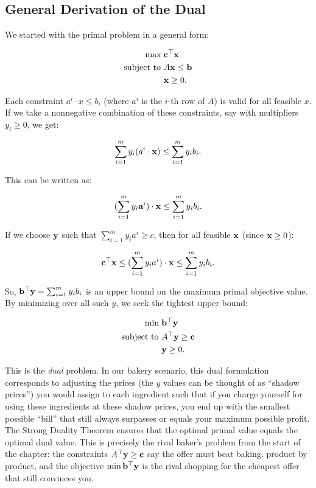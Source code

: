 \subsection*{General Derivation of the Dual}

We started with the primal problem in a general form:

\[
\begin{aligned}
\max \; & \mathbf{c}^\top \mathbf{x} \\
\mbox{subject to } & A\mathbf{x} \leq \mathbf{b} \\
& \mathbf{x} \geq 0.
\end{aligned}
\]

Each constraint $a^i \cdot x \leq b_i$ (where $a^i$ is the $i$-th row of $A$) is valid for all feasible $x$. If we take a nonnegative combination of these constraints, say with multipliers $y_i \geq 0$, we get:

\[
\sum_{i=1}^m y_i (a^i \cdot \mathbf{x}) \leq \sum_{i=1}^m y_i b_i.
\]

This can be written as:

\[
(\sum_{i=1}^m y_i \mathbf{a}^i) \cdot \mathbf{x} \leq \sum_{i=1}^m y_i b_i.
\]

If we choose $\mathbf{y}$ such that $\sum_{i=1}^m y_i a^i \geq c$, then for all feasible $\mathbf{x}$ (since $\mathbf{x} \geq 0$):

\[
\mathbf{c}^\top \mathbf{x} \leq (\sum_{i=1}^m y_i a^i)\cdot \mathbf{x} \leq \sum_{i=1}^m y_i b_i.
\]

So, $\mathbf{b}^\top \mathbf{y} = \sum_{i=1}^m y_i b_i$ is an upper bound on the maximum primal objective value. By minimizing over all such $y$, we seek the tightest upper bound:

\[
\begin{aligned}
\min \; & \mathbf{b}^\top \mathbf{y} \\
\mbox{subject to } & A^\top \mathbf{y} \geq \mathbf{c} \\
& \mathbf{y} \geq 0.
\end{aligned}
\]

This is the \emph{dual} problem. In our bakery scenario, this dual formulation corresponds to adjusting the prices (the $y$ values can be thought of as ``shadow prices'') you would assign to each ingredient such that if you charge yourself for using these ingredients at these shadow prices, you end up with the smallest possible ``bill'' that still always surpasses or equals your maximum possible profit. The Strong Duality Theorem ensures that the optimal primal value equals the optimal dual value. This is precisely the rival baker's problem from the start of the chapter: the constraints $A^\top \mathbf{y} \geq \mathbf{c}$ say the offer must beat baking, product by product, and the objective $\min \mathbf{b}^\top \mathbf{y}$ is the rival shopping for the cheapest offer that still convinces you.

